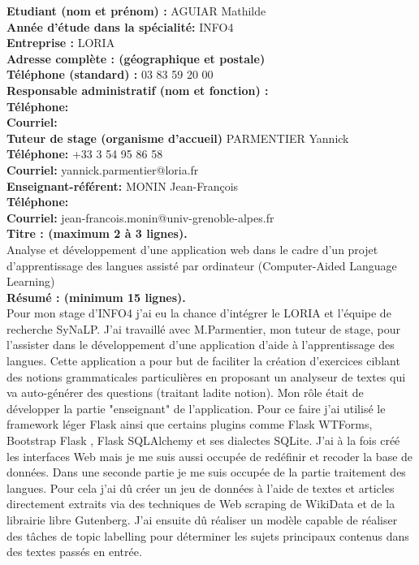 

\textbf{Etudiant (nom et prénom) :} AGUIAR Mathilde \\
\textbf{Année d’étude dans la spécialité:} INFO4 \\

\textbf{Entreprise :} LORIA \\
\textbf{Adresse complète : (géographique et postale)} \\
\textbf{Téléphone (standard) :} 03 83 59 20 00 \\

\textbf{Responsable administratif (nom et fonction) :}\\
\textbf{Téléphone:} \\
\textbf{Courriel:}\\

\textbf{Tuteur de stage (organisme d’accueil)} PARMENTIER Yannick\\
\textbf{Téléphone:} +33 3 54 95 86 58 \\
\textbf{Courriel:} yannick.parmentier@loria.fr \\

\textbf{Enseignant-référent:} MONIN Jean-François \\
\textbf{Téléphone:} \\
\textbf{Courriel:} jean-francois.monin@univ-grenoble-alpes.fr \\

\textbf{Titre : (maximum 2 à 3 lignes).} \\
Analyse et développement d’une application web dans le cadre d’un projet
d’apprentissage des langues assisté par ordinateur (Computer-Aided Language
Learning) \\
\textbf{Résumé : (minimum 15 lignes).}\\
Pour mon stage d’INFO4 j’ai eu la chance d’intégrer le LORIA et l’équipe de recherche SyNaLP. J’ai travaillé avec M.Parmentier, mon tuteur de stage, pour l’assister dans le développement d’une application d’aide à l’apprentissage des langues. Cette application a pour but de faciliter la création d’exercices ciblant des notions grammaticales particulières en proposant un analyseur de textes qui va auto-générer des questions (traitant ladite notion). 
Mon rôle était de développer la partie "enseignant" de l’application. Pour ce faire j’ai utilisé le framework léger Flask ainsi que certains plugins comme Flask WTForms, Bootstrap Flask , Flask SQLAlchemy et ses dialectes SQLite. J’ai à la fois créé les interfaces Web mais je me suis aussi occupée de redéfinir et recoder la base de données. 
Dans une seconde partie je me suis occupée de la partie traitement des langues. Pour cela j'ai dû créer un jeu de données à l'aide de textes et articles directement extraits via des techniques de Web scraping de WikiData et de la librairie libre Gutenberg. J'ai ensuite dû réaliser un modèle capable de réaliser des tâches de topic labelling pour déterminer les sujets principaux contenus dans des textes passés en entrée. 


